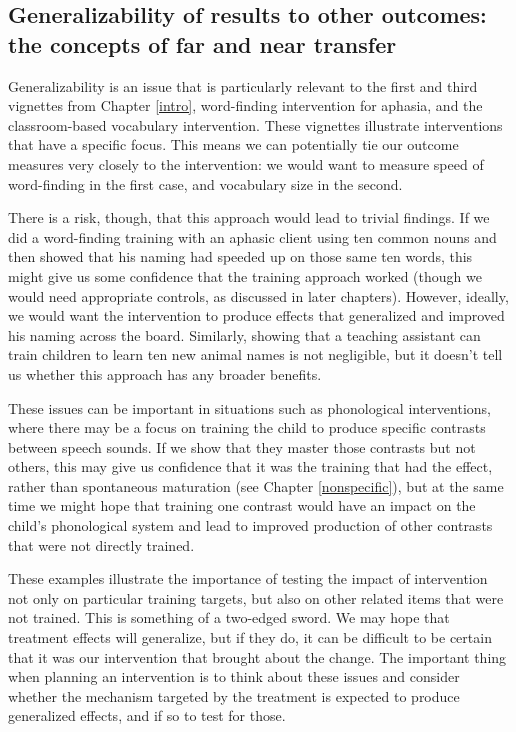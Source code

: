 \documentclass{krantz}
\begin{document}
\hypertarget{generalizability-of-results-to-other-outcomes-the-concepts-of-far-and-near-transfer}{%
\subsection{Generalizability of results to other outcomes: the concepts of far and near transfer}\label{generalizability-of-results-to-other-outcomes-the-concepts-of-far-and-near-transfer}}

Generalizability is an issue that is particularly relevant to the first and third vignettes from Chapter \ref{intro}, word-finding intervention for aphasia, and the classroom-based vocabulary intervention. These vignettes illustrate interventions that have a specific focus. This means we can potentially tie our outcome measures very closely to the intervention: we would want to measure speed of word-finding in the first case, and vocabulary size in the second.

There is a risk, though, that this approach would lead to trivial findings. If we did a word-finding training with an aphasic client using ten common nouns and then showed that his naming had speeded up on those same ten words, this might give us some confidence that the training approach worked (though we would need appropriate controls, as discussed in later chapters). However, ideally, we would want the intervention to produce effects that generalized and improved his naming across the board. Similarly, showing that a teaching assistant can train children to learn ten new animal names is not negligible, but it doesn't tell us whether this approach has any broader benefits.

These issues can be important in situations such as phonological interventions, where there may be a focus on training the child to produce specific contrasts between speech sounds. If we show that they master those contrasts but not others, this may give us confidence that it was the training that had the effect, rather than spontaneous maturation (see Chapter \ref{nonspecific}), but at the same time we might hope that training one contrast would have an impact on the child's phonological system and lead to improved production of other contrasts that were not directly trained.

These examples illustrate the importance of testing the impact of intervention not only on particular training targets, but also on other related items that were not trained. This is something of a two-edged sword. We may hope that treatment effects will generalize, but if they do, it can be difficult to be certain that it was our intervention that brought about the change. The important thing when planning an intervention is to think about these issues and consider whether the mechanism targeted by the treatment is expected to produce generalized effects, and if so to test for those.
\end{document}
